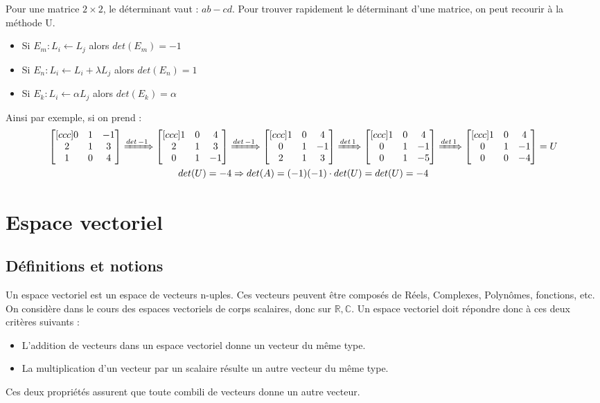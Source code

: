 \documentclass[a4paper]{book}
\begin{document}
Pour une matrice $2\times 2$, le déterminant vaut : $ab-cd$. Pour trouver rapidement le déterminant d'une matrice, on peut recourir à la méthode U.
\begin{itemize}
    \item Si $E_m : L_i \leftarrow L_j$ alors $det(E_m) = -1$
    \item Si $E_n : L_i \leftarrow L_i + \lambda L_j$ alors $det(E_n) = 1$
    \item Si $E_k : L_i \leftarrow \alpha L_j$ alors $det(E_k) = \alpha $
\end{itemize}
Ainsi par exemple, si on prend :
\begin{gather}
    \begin{bmatrix}[ccc]
    0 & 1 & -1 \\
    2 & 1 & 3 \\
    1 & 0 & 4
    \end{bmatrix}
    \xRightarrow{det \,-1}
    \begin{bmatrix}[ccc]
    1 & 0 & 4 \\
    2 & 1 & 3 \\
    0 & 1 & -1
    \end{bmatrix}
    \xRightarrow{det \,-1}
    \begin{bmatrix}[ccc]
    1 & 0 & 4 \\
    0 & 1 & -1 \\
    2 & 1 & 3
    \end{bmatrix}
    \xRightarrow{det \,1}
    \begin{bmatrix}[ccc]
    1 & 0 & 4 \\
    0 & 1 & -1 \\
    0 & 1 & -5
    \end{bmatrix}
    \xRightarrow{det \,1}
    \begin{bmatrix}[ccc]
    1 & 0 & 4 \\
    0 & 1 & -1 \\
    0 & 0 & -4
    \end{bmatrix} = U
    \\
    det(U) = -4 \Rightarrow det(A) = (-1)(-1)\cdot det(U) = det(U) = -4
\end{gather}
\chapter{Espace vectoriel}
\section{Définitions et notions}
Un espace vectoriel est un espace de vecteurs n-uples. Ces vecteurs peuvent être composés de Réels, Complexes, Polynômes, fonctions, etc. On considère dans le cours des espaces vectoriels de corps scalaires, donc sur $\mathbb{R}, \mathbb{C}$. Un espace vectoriel doit répondre donc à ces deux critères suivants :
\begin{itemize}
    \item L'addition de vecteurs dans un espace vectoriel donne un vecteur du même type.
    \item La multiplication d'un vecteur par un scalaire résulte un autre vecteur du même type.
\end{itemize}
Ces deux propriétés assurent que toute combili de vecteurs donne un autre vecteur.
\end{document}
